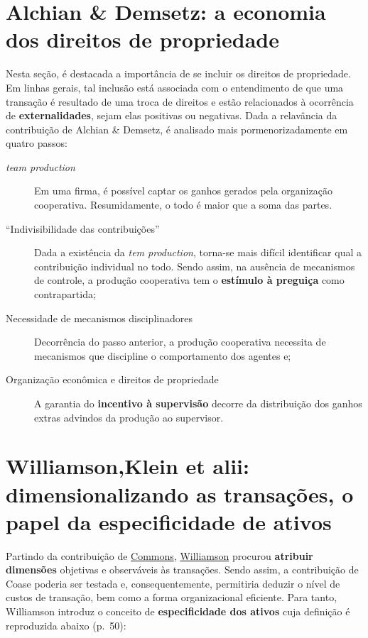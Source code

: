 \documentclass[9pt,twocolumn,twoside,lineno]{style}
\begin{document}
\section{Alchian \& Demsetz: a economia dos direitos de propriedade}

Nesta seção, é destacada a importância de se incluir os direitos de propriedade. Em linhas gerais, tal inclusão está associada com o entendimento de que uma transação é resultado de uma troca de direitos e estão relacionados à ocorrência de \textbf{externalidades}, sejam elas positivas ou negativas. Dada a relavância da contribuição de Alchian \& Demsetz, é analisado mais pormenorizadamente em quatro passos:

\begin{description}
	\item[\textit{team production}] Em uma firma, é possível captar os ganhos gerados pela organização cooperativa. Resumidamente, o todo é maior que a soma das partes.
	\item[``Indivisibilidade das contribuições''] Dada a existência da \textit{tem production}, torna-se mais difícil identificar qual a contribuição individual no todo. Sendo assim, na ausência de mecanismos de controle, a produção cooperativa tem o \textbf{estímulo à preguiça} como contrapartida;
	\item[Necessidade de mecanismos disciplinadores] Decorrência do passo anterior, a produção cooperativa necessita de mecanismos que discipline o comportamento dos agentes e;
	\item[Organização econômica e direitos de propriedade] A garantia do \textbf{incentivo à supervisão} decorre da distribuição dos ganhos extras advindos da produção ao supervisor.
\end{description}

\section{Williamson,Klein et alii: dimensionalizando as transações, o papel da especificidade de ativos}

Partindo da contribuição de \underline{Commons}, \underline{Williamson} procurou \textbf{atribuir dimensões} objetivas e observáveis às transações. Sendo assim, a contribuição de Coase poderia ser testada e, consequentemente, permitiria deduzir o nível de custos de transação, bem como a forma organizacional eficiente. Para tanto, Williamson introduz o conceito de \textbf{especificidade dos ativos} cuja definição é reproduzida abaixo (p.~50):
\end{document}
